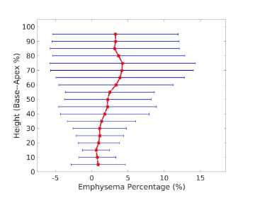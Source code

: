 \begin{figure}[H]
\begin{subfigure}{.4\linewidth}
  \includegraphics[width=\linewidth,trim={{.0\wd0} {.0\wd0} {.0\wd0} {.0\wd0}},clip]{QuantitativeAnalysis/Image/LeftLungEmphysemaDiseaseAgainstHeight.jpg} %
  \caption{}
  \label{fig:DiseaseAgainstHeight-g} 
\end{subfigure} 
\begin{subfigure}{.4\linewidth}%

\end{subfigure}
\end{figure}
